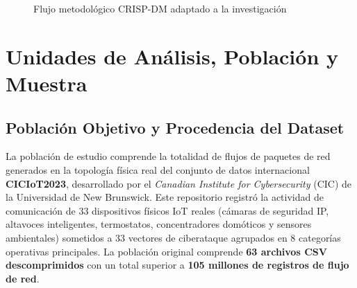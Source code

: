\begin{figure}[H]
\centering
\caption{Flujo metodológico CRISP-DM adaptado a la investigación}
\label{fig:crisp_dm_diagrama_mm}
\end{figure}

\section{Unidades de Análisis, Población y Muestra}

\subsection{Población Objetivo y Procedencia del Dataset}
La población de estudio comprende la totalidad de flujos de paquetes de red generados en la topología física real del conjunto de datos internacional \textbf{CICIoT2023}, desarrollado por el \textit{Canadian Institute for Cybersecurity} (CIC) de la Universidad de New Brunswick. Este repositorio registró la actividad de comunicación de 33 dispositivos físicos IoT reales (cámaras de seguridad IP, altavoces inteligentes, termostatos, concentradores domóticos y sensores ambientales) sometidos a 33 vectores de ciberataque agrupados en 8 categorías operativas principales. La población original comprende \textbf{63 archivos CSV descomprimidos} con un total superior a \textbf{105 millones de registros de flujo de red}.

